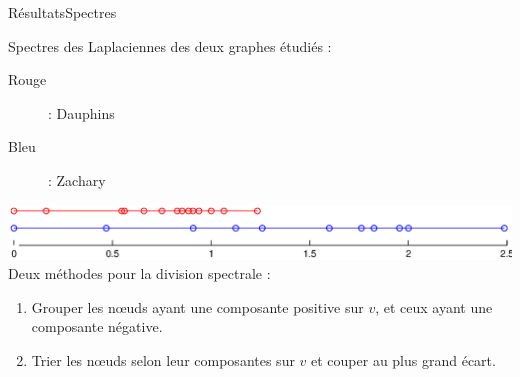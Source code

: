 \documentclass{beamer}
\begin{document}
\begin{frame}{Résultats}{Spectres}
		\begin{center}
			Spectres des Laplaciennes des deux graphes étudiés :
			\begin{description}
				\item[\alert{Rouge}] : Dauphins
				\item[Bleu] : Zachary
			\end{description}
			\bigskip
			\includegraphics[width=\textwidth]{new_plots/spectres}\\
			\bigskip
			Deux méthodes pour la division spectrale :
			\begin{enumerate}
				\item Grouper les n\oe uds ayant une composante positive sur $v$, et ceux ayant une composante négative.
				\item Trier les n\oe uds selon leur composantes sur $v$ et couper au plus grand écart.
			\end{enumerate}
		\end{center}
\end{frame}
\end{document}
